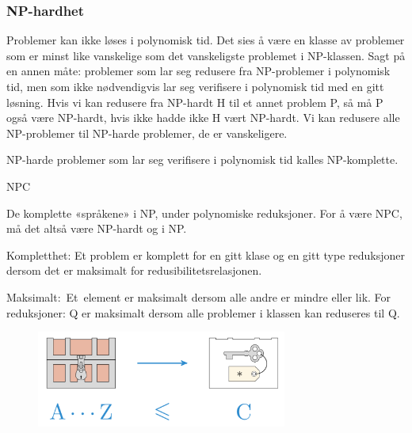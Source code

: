 \documentclass[12pt]{report}
\begin{document}
\vspace{\baselineskip}

\vspace{\baselineskip}
\subsubsection*{NP-hardhet}
Problemer kan ikke løses i polynomisk tid. Det sies å være en klasse av problemer som er minst like vanskelige som det vanskeligste problemet i NP-klassen. Sagt på en annen måte: problemer som lar seg redusere fra NP-problemer i polynomisk tid, men som ikke nødvendigvis lar seg verifisere i polynomisk tid med en gitt løsning. Hvis vi kan redusere fra NP-hardt H til et annet problem P, så må P også være NP-hardt, hvis ikke hadde ikke H vært NP-hardt. Vi kan redusere alle NP-problemer til NP-harde problemer, de er vanskeligere.\par

NP-harde problemer som lar seg verifisere i polynomisk tid kalles NP-komplette.\par


\vspace{\baselineskip}
{\fontsize{16pt}{19.2pt}\selectfont NPC\par}\par

\setlength{\parskip}{0.0pt}
De komplette «språkene» i NP, under polynomiske reduksjoner. For å være NPC, må det altså være NP-hardt og i NP.\par

	\item Kompletthet: Et problem er komplett for en gitt klase og en gitt type reduksjoner dersom det er maksimalt for redusibilitetsrelasjonen. \par

	\item Maksimalt:\ Et\ element er maksimalt dersom alle  andre er mindre eller lik. For reduksjoner: Q er maksimalt dersom alle problemer i klassen kan reduseres til Q.  \par




\begin{figure}[H]
	\begin{Center}
		\includegraphics[width=3.24in,height=1.25in]{./media/image155.png}
	\end{Center}
\end{figure}
\end{document}
